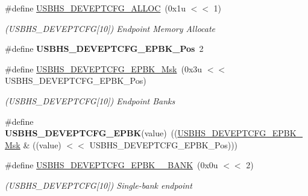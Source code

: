 \begin{DoxyCompactItemize}
\#define \mbox{\hyperlink{group__SAME70__USBHS_gaca800bdf4e2d323dcf1455b8c6b77941}{U\+S\+B\+H\+S\+\_\+\+D\+E\+V\+E\+P\+T\+C\+F\+G\+\_\+\+A\+L\+L\+OC}}~(0x1u $<$$<$ 1)
\begin{DoxyCompactList}\small\item\em (U\+S\+B\+H\+S\+\_\+\+D\+E\+V\+E\+P\+T\+C\+FG\mbox{[}10\mbox{]}) Endpoint Memory Allocate \end{DoxyCompactList}\item 
\mbox{\label{group__SAME70__USBHS_ga9c204c7785eb0c1f229018919cdd962d}} 
\#define {\bfseries U\+S\+B\+H\+S\+\_\+\+D\+E\+V\+E\+P\+T\+C\+F\+G\+\_\+\+E\+P\+B\+K\+\_\+\+Pos}~2
\item 
\mbox{\label{group__SAME70__USBHS_ga21ff629a9b5ae6ea0e8255180ca92df3}} 
\#define \mbox{\hyperlink{group__SAME70__USBHS_ga21ff629a9b5ae6ea0e8255180ca92df3}{U\+S\+B\+H\+S\+\_\+\+D\+E\+V\+E\+P\+T\+C\+F\+G\+\_\+\+E\+P\+B\+K\+\_\+\+Msk}}~(0x3u $<$$<$ U\+S\+B\+H\+S\+\_\+\+D\+E\+V\+E\+P\+T\+C\+F\+G\+\_\+\+E\+P\+B\+K\+\_\+\+Pos)
\begin{DoxyCompactList}\small\item\em (U\+S\+B\+H\+S\+\_\+\+D\+E\+V\+E\+P\+T\+C\+FG\mbox{[}10\mbox{]}) Endpoint Banks \end{DoxyCompactList}\item 
\mbox{\label{group__SAME70__USBHS_ga9bef4082a7cfc52ef17b3b669a605829}} 
\#define {\bfseries U\+S\+B\+H\+S\+\_\+\+D\+E\+V\+E\+P\+T\+C\+F\+G\+\_\+\+E\+P\+BK}(value)~((\mbox{\hyperlink{group__SAMV71__USBHS_ga21ff629a9b5ae6ea0e8255180ca92df3}{U\+S\+B\+H\+S\+\_\+\+D\+E\+V\+E\+P\+T\+C\+F\+G\+\_\+\+E\+P\+B\+K\+\_\+\+Msk}} \& ((value) $<$$<$ U\+S\+B\+H\+S\+\_\+\+D\+E\+V\+E\+P\+T\+C\+F\+G\+\_\+\+E\+P\+B\+K\+\_\+\+Pos)))
\item 
\mbox{\label{group__SAME70__USBHS_gad917d30d65138878950a81c136360142}} 
\#define \mbox{\hyperlink{group__SAME70__USBHS_gad917d30d65138878950a81c136360142}{U\+S\+B\+H\+S\+\_\+\+D\+E\+V\+E\+P\+T\+C\+F\+G\+\_\+\+E\+P\+B\+K\+\_\+\_\+\+B\+A\+NK}}~(0x0u $<$$<$ 2)
\begin{DoxyCompactList}\small\item\em (U\+S\+B\+H\+S\+\_\+\+D\+E\+V\+E\+P\+T\+C\+FG\mbox{[}10\mbox{]}) Single-\/bank endpoint \end{DoxyCompactList}\item 

\end{DoxyCompactItemize}
